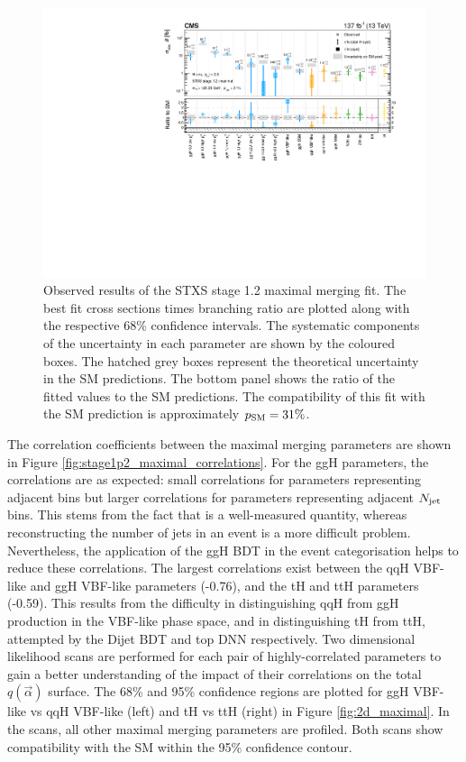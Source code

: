 \begin{figure}[htbp]
  \centering
  \includegraphics[width=1\textwidth]{Figures/hgg_results/stage1p2_maximal_summary.pdf}
  \caption[Results of the STXS stage 1.2 maximal merging fit]
  {
    Observed results of the STXS stage 1.2 maximal merging fit. The best fit cross sections times branching ratio are plotted along with the respective 68\% confidence intervals. The systematic components of the uncertainty in each parameter are shown by the coloured boxes. The hatched grey boxes represent the theoretical uncertainty in the SM predictions. The bottom panel shows the ratio of the fitted values to the SM predictions. The compatibility of this fit with the SM prediction is approximately $p_{\rm{SM}}=31\%$. 
  }
  \label{fig:stage1p2_maximal_results}
\end{figure}

The correlation coefficients between the maximal merging parameters are shown in Figure \ref{fig:stage1p2_maximal_correlations}. For the ggH parameters, the correlations are as expected: small correlations for parameters representing adjacent \ptH bins but larger correlations for parameters representing adjacent $N_{\rm{jet}}$ bins. This stems from the fact that \ptgg is a well-measured quantity, whereas reconstructing the number of jets in an event is a more difficult problem. Nevertheless, the application of the ggH BDT in the event categorisation helps to reduce these correlations. The largest correlations exist between the qqH VBF-like and ggH VBF-like parameters (-0.76), and the tH and ttH parameters (-0.59). This results from the difficulty in distinguishing qqH from ggH production in the VBF-like phase space, and in distinguishing tH from ttH, attempted by the Dijet BDT and top DNN respectively. Two dimensional likelihood scans are performed for each pair of highly-correlated parameters to gain a better understanding of the impact of their correlations on the total $q(\vec{\alpha})$ surface. The 68\% and 95\% confidence regions are plotted for ggH VBF-like vs qqH VBF-like (left) and tH vs ttH (right) in Figure \ref{fig:2d_maximal}. In the scans, all other maximal merging parameters are profiled. Both scans show compatibility with the SM within the 95\% confidence contour.

